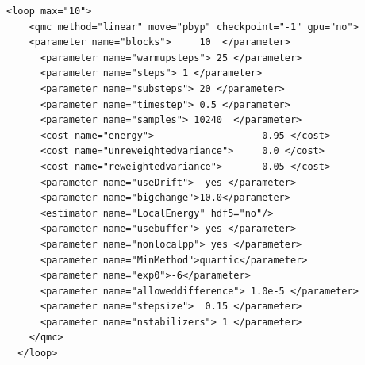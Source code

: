 {\begin{lstlisting}[style=QMCPXML,caption=``Sample XML optimization block.",label=lst:lam_xml_opt]
  <loop max="10">
    <qmc method="linear" move="pbyp" checkpoint="-1" gpu="no">
    <parameter name="blocks">     10  </parameter>
      <parameter name="warmupsteps"> 25 </parameter>
      <parameter name="steps"> 1 </parameter>
      <parameter name="substeps"> 20 </parameter>
      <parameter name="timestep"> 0.5 </parameter>
      <parameter name="samples"> 10240  </parameter>
      <cost name="energy">                   0.95 </cost>
      <cost name="unreweightedvariance">     0.0 </cost>
      <cost name="reweightedvariance">       0.05 </cost>
      <parameter name="useDrift">  yes </parameter>
      <parameter name="bigchange">10.0</parameter>
      <estimator name="LocalEnergy" hdf5="no"/>
      <parameter name="usebuffer"> yes </parameter>
      <parameter name="nonlocalpp"> yes </parameter>
      <parameter name="MinMethod">quartic</parameter>
      <parameter name="exp0">-6</parameter>
      <parameter name="alloweddifference"> 1.0e-5 </parameter>
      <parameter name="stepsize">  0.15 </parameter>
      <parameter name="nstabilizers"> 1 </parameter>
    </qmc>
  </loop>
\end{lstlisting}

}
